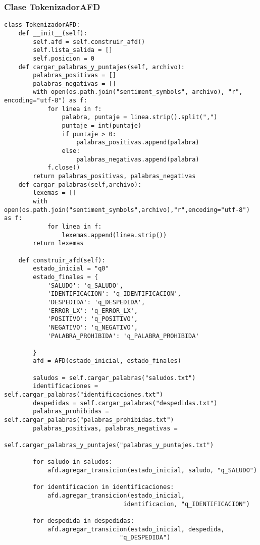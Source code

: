 \documentclass[12pt,a4paper]{article}
\begin{document}
\subsubsection{Clase TokenizadorAFD}
\begin{verbatim}
class TokenizadorAFD:
    def __init__(self):
        self.afd = self.construir_afd()
        self.lista_salida = []
        self.posicion = 0
    def cargar_palabras_y_puntajes(self, archivo):
        palabras_positivas = []
        palabras_negativas = []
        with open(os.path.join("sentiment_symbols", archivo), "r", encoding="utf-8") as f:
            for linea in f:
                palabra, puntaje = linea.strip().split(",")
                puntaje = int(puntaje)
                if puntaje > 0:
                    palabras_positivas.append(palabra)
                else:
                    palabras_negativas.append(palabra)
            f.close()
        return palabras_positivas, palabras_negativas
    def cargar_palabras(self,archivo):
        lexemas = []
        with open(os.path.join("sentiment_symbols",archivo),"r",encoding="utf-8") as f:
            for linea in f:
                lexemas.append(linea.strip())
        return lexemas

    def construir_afd(self):
        estado_inicial = "q0"
        estado_finales = {
            'SALUDO': 'q_SALUDO',
            'IDENTIFICACION': 'q_IDENTIFICACION',
            'DESPEDIDA': 'q_DESPEDIDA',
            'ERROR_LX': 'q_ERROR_LX',
            'POSITIVO': 'q_POSITIVO',
            'NEGATIVO': 'q_NEGATIVO',
            'PALABRA_PROHIBIDA': 'q_PALABRA_PROHIBIDA' 

        }     
        afd = AFD(estado_inicial, estado_finales)
        
        saludos = self.cargar_palabras("saludos.txt")
        identificaciones = self.cargar_palabras("identificaciones.txt")
        despedidas = self.cargar_palabras("despedidas.txt")
        palabras_prohibidas = self.cargar_palabras("palabras_prohibidas.txt")
        palabras_positivas, palabras_negativas = 
                    self.cargar_palabras_y_puntajes("palabras_y_puntajes.txt")

        for saludo in saludos:
            afd.agregar_transicion(estado_inicial, saludo, "q_SALUDO")

        for identificacion in identificaciones:
            afd.agregar_transicion(estado_inicial,
                                 identificacion, "q_IDENTIFICACION")

        for despedida in despedidas:
            afd.agregar_transicion(estado_inicial, despedida, 
                                "q_DESPEDIDA")


\end{verbatim}
\end{document}
